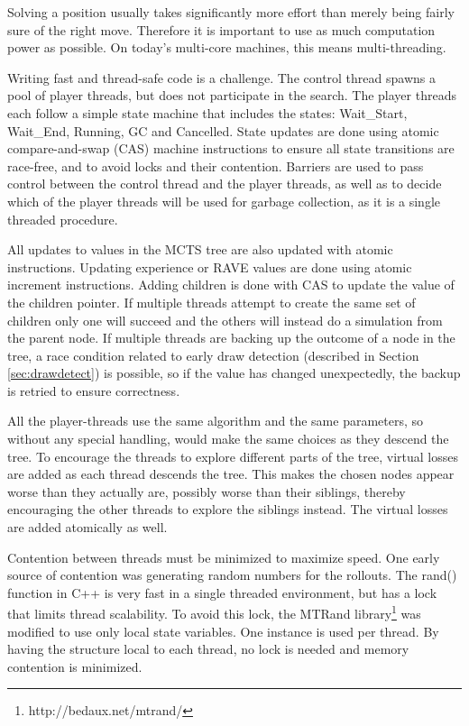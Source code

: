 Solving a position usually takes significantly more effort than merely being fairly sure of the right move. Therefore it is important to use as much computation power as possible. On today's multi-core machines, this means multi-threading.

Writing fast and thread-safe code is a challenge. The control thread spawns a pool of player threads, but does not participate in the search. The player threads each follow a simple state machine that includes the states: Wait\_Start, Wait\_End, Running, GC and Cancelled. State updates are done using atomic compare-and-swap (CAS) machine instructions to ensure all state transitions are race-free, and to avoid locks and their contention. Barriers are used to pass control between the control thread and the player threads, as well as to decide which of the player threads will be used for garbage collection, as it is a single threaded procedure.

All updates to values in the MCTS tree are also updated with atomic instructions. Updating experience or RAVE values are done using atomic increment instructions. Adding children is done with CAS to update the value of the children pointer. If multiple threads attempt to create the same set of children only one will succeed and the others will instead do a simulation from the parent node. If multiple threads are backing up the outcome of a node in the tree, a race condition related to early draw detection (described in Section \ref{sec:drawdetect}) is possible, so if the value has changed unexpectedly, the backup is retried to ensure correctness.

All the player-threads use the same algorithm and the same parameters, so without any special handling, would make the same choices as they descend the tree. To encourage the threads to explore different parts of the tree, virtual losses\cite{chaslot2008parallel} are added as each thread descends the tree. This makes the chosen nodes appear worse than they actually are, possibly worse than their siblings, thereby encouraging the other threads to explore the siblings instead. The virtual losses are added atomically as well.

Contention between threads must be minimized to maximize speed. One early source of contention was generating random numbers for the rollouts. The rand() function in C++ is very fast in a single threaded environment, but has a lock that limits thread scalability. To avoid this lock, the MTRand library\footnote{http://bedaux.net/mtrand/} was modified to use only local state variables. One instance is used per thread. By having the structure local to each thread, no lock is needed and memory contention is minimized.

